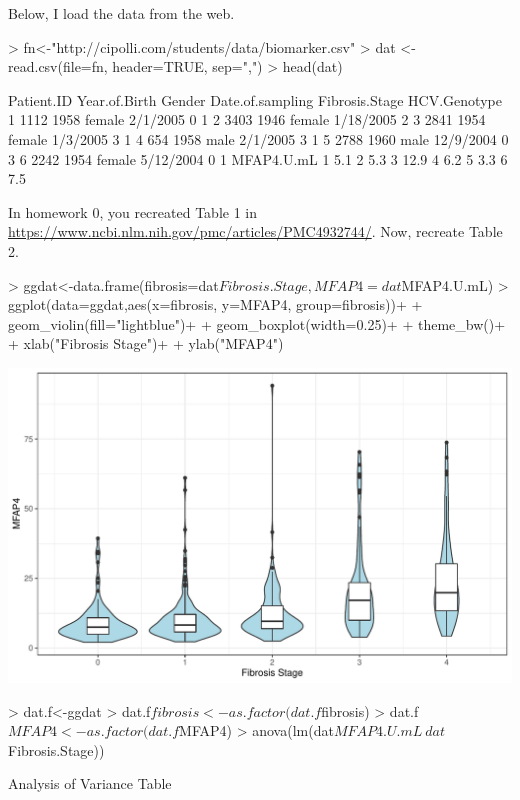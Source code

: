 \documentclass{article}
\begin{document}
\begin{enumerate}
    Below, I load the data from the web.
\begin{Schunk}
\begin{Sinput}
> fn<-"http://cipolli.com/students/data/biomarker.csv"
> dat <- read.csv(file=fn, header=TRUE, sep=",")
> head(dat)
\end{Sinput}
\begin{Soutput}
  Patient.ID Year.of.Birth Gender Date.of.sampling Fibrosis.Stage HCV.Genotype
1       1112          1958 female         2/1/2005              0            1
2       3403          1946 female        1/18/2005              2             
3       2841          1954 female         1/3/2005              3            1
4        654          1958   male         2/1/2005              3            1
5       2788          1960   male        12/9/2004              0            3
6       2242          1954 female        5/12/2004              0            1
  MFAP4.U.mL
1        5.1
2        5.3
3       12.9
4        6.2
5        3.3
6        7.5
\end{Soutput}
\end{Schunk}
In homework 0, you recreated Table 1 in \href{the paper}{https://www.ncbi.nlm.nih.gov/pmc/articles/PMC4932744/}. 
Now, recreate Table 2.
\begin{Schunk}
\begin{Sinput}
> ggdat<-data.frame(fibrosis=dat$Fibrosis.Stage, MFAP4=dat$MFAP4.U.mL)
> ggplot(data=ggdat,aes(x=fibrosis, y=MFAP4, group=fibrosis))+
+   geom_violin(fill="lightblue")+
+   geom_boxplot(width=0.25)+
+   theme_bw()+
+   xlab("Fibrosis Stage")+
+   ylab("MFAP4")
\end{Sinput}
\end{Schunk}
\includegraphics{HW4-006}

\begin{Schunk}
\begin{Sinput}
> dat.f<-ggdat
> dat.f$fibrosis<-as.factor(dat.f$fibrosis)
> dat.f$MFAP4<-as.factor(dat.f$MFAP4)
> anova(lm(dat$MFAP4.U.mL~dat$Fibrosis.Stage))
\end{Sinput}
\begin{Soutput}
Analysis of Variance Table


\end{Soutput}
\end{Schunk}
\end{enumerate}
\end{document}
